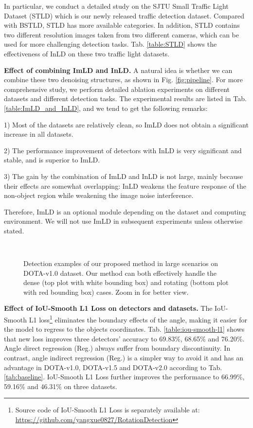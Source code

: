 \documentclass[10pt,journal,compsoc]{IEEEtran}
\begin{document}
In particular, we conduct a detailed study on the SJTU Small Traffic Light Dataset (STLD) which is our newly released traffic detection dataset. Compared with BSTLD, STLD has more available categories. In addition, STLD contains two different resolution images taken from two different cameras, which can be used for more challenging detection tasks. Tab. \ref{table:STLD} shows the effectiveness of InLD on these two traffic light datasets.

\textbf{Effect of combining ImLD and InLD.}
A natural idea is whether we can combine these two denoising structures, as shown in Fig. \ref{fig:pipeline}. For more comprehensive study, we perform detailed ablation experiments on different datasets and different detection tasks. The experimental results are listed in Tab. \ref{table:ImLD_and_InLD}, and we tend to get the following remarks:

1) Most of the datasets are relatively clean, so ImLD does not obtain a significant increase in all datasets.

2) The performance improvement of detectors with InLD is very significant and stable, and is superior to ImLD.

3) The gain by the combination of ImLD and InLD is not large, mainly because their effects are somewhat overlapping: InLD weakens the feature response of the non-object region while weakening the image noise interference.

Therefore, ImLD is an optional module depending on the dataset and  computing environment. We will not use ImLD in subsequent experiments unless otherwise stated.
\begin{figure*}[!tb]
	\centering
	\\
	\caption{Detection examples of our proposed method in large scenarios on DOTA-v1.0 dataset. Our method can both effectively handle the dense (top plot with white bounding box) and rotating (bottom plot with red bounding box) cases. Zoom in for better view.}
	\label{fig:LS}
\end{figure*}


\textbf{Effect of IoU-Smooth L1 Loss on detectors and datasets.}
The IoU-Smooth L1 loss\footnote{Source code of IoU-Smooth L1 Loss is separately available at:  \url{https://github.com/yangxue0827/RotationDetection}} eliminates the boundary effects of the angle, making it easier for the model to regress to the objects coordinates. Tab. \ref{table:iou-smooth-l1} shows that new loss improves three detectors' accuracy to 69.83\%, 68.65\% and 76.20\%. Angle direct regression (Reg.) always suffer from boundary discontinuity. In contrast, angle indirect regression (Reg.) is a simpler way to avoid it and has an advantage in DOTA-v1.0, DOTA-v1.5 and DOTA-v2.0 according to Tab. \ref{tab:baseline}. IoU-Smooth L1 Loss further improves the performance to 66.99\%, 59.16\% and 46.31\% on three datasets.
\end{document}
